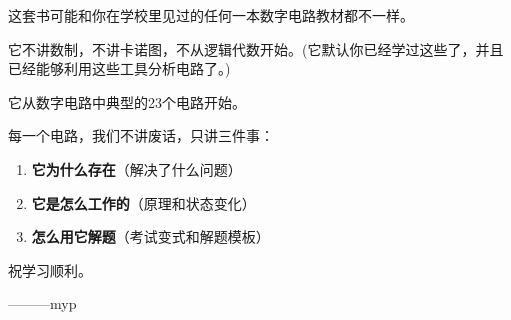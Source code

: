 这套书可能和你在学校里见过的任何一本数字电路教材都不一样。

它不讲数制，不讲卡诺图，不从逻辑代数开始。(它默认你已经学过这些了，并且已经能够利用这些工具分析电路了。)

它从数字电路中典型的23个电路开始。

每一个电路，我们不讲废话，只讲三件事：

\begin{enumerate}
  \item \textbf{它为什么存在}（解决了什么问题）
  \item \textbf{它是怎么工作的}（原理和状态变化）
  \item \textbf{怎么用它解题}（考试变式和解题模板）
\end{enumerate}

祝学习顺利。

\vspace{2cm}
\hfill ———myp
